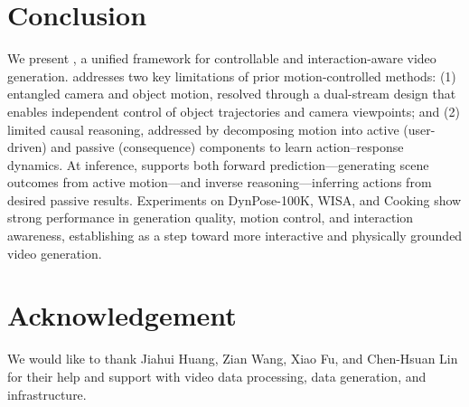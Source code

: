 \section{Conclusion}

We present \ours, a unified framework for controllable and interaction-aware video generation. \ours addresses two key limitations of prior motion-controlled methods: (1) entangled camera and object motion, resolved through a dual-stream design that enables independent control of object trajectories and camera viewpoints; and (2) limited causal reasoning, addressed by decomposing motion into active (user-driven) and passive (consequence) components to learn action--response dynamics. At inference, \ours supports both forward prediction—generating scene outcomes from active motion—and inverse reasoning—inferring actions from desired passive results. Experiments on DynPose-100K, WISA, and Cooking show strong performance in generation quality, motion control, and interaction awareness, establishing \ours as a step toward more interactive and physically grounded video generation.

\section*{Acknowledgement}
We would like to thank Jiahui Huang, Zian Wang, Xiao Fu, and Chen-Hsuan Lin for their help and support with video data processing, data generation, and infrastructure.
